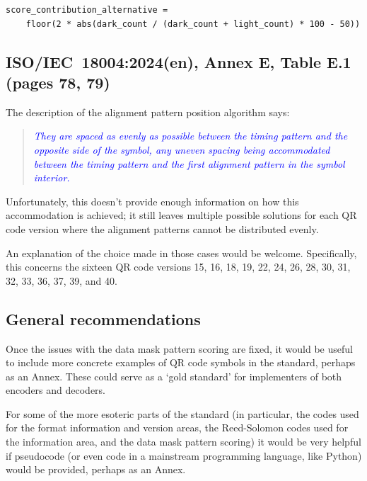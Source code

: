 \documentclass[a4paper,twoside]{article}
\newcommand{\shortstandard}{ISO/IEC~18004}
\newcommand{\standard}{\shortstandard:2024(en)}
\newcommand{\quotestandard}[1]{\textcolor{blue}{\textit{#1}}}
\begin{document}
\begin{verbatim}
score_contribution_alternative =
    floor(2 * abs(dark_count / (dark_count + light_count) * 100 - 50))
\end{verbatim}

\subsection{\standard, Annex E, Table E.1 (pages 78, 79)}

The description of the alignment pattern position algorithm says:

\begin{quote}
\quotestandard{They are spaced as evenly as possible between the timing pattern and the opposite side of the symbol, any uneven
spacing being accommodated between the timing pattern and the first alignment pattern in the symbol interior.}
\end{quote}

Unfortunately, this doesn't provide enough information on how this accommodation is achieved; it still leaves multiple
possible solutions for each QR code version where the alignment patterns cannot be distributed evenly.

An explanation  of the choice made in those cases would be welcome. Specifically, this concerns the sixteen QR code versions
15, 16, 18, 19, 22, 24, 26, 28, 30, 31, 32, 33, 36, 37, 39, and 40.

\subsection{General recommendations}

Once the issues with the data mask pattern scoring are fixed, it would be useful to include more concrete examples
of QR code symbols in the standard, perhaps as an Annex. These could serve as a `gold standard' for implementers of both
encoders and decoders.

For some of the more esoteric parts of the standard (in particular, the codes used for the format information and version areas,
the Reed-Solomon codes used for the information area, and the data mask pattern scoring) it would be very helpful if pseudocode
(or even code in a mainstream programming language, like Python) would be provided, perhaps as an Annex.
\end{document}
